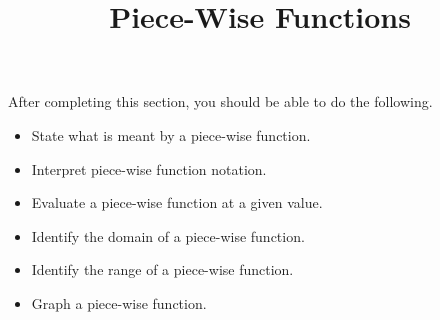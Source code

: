 \documentclass{ximera}
\title{Piece-Wise Functions}
\begin{document}
\begin{abstract} 
\end{abstract}

\maketitle

\begin{sectionOutcomes}
After completing this section, you should be able to do the following.

\begin{itemize}
	\item State what is meant by a piece-wise function.
    \item Interpret piece-wise function notation.
    \item Evaluate a piece-wise function at a given value.
    \item Identify the domain of a piece-wise function.
    \item Identify the range of a piece-wise function.
    \item Graph a piece-wise function.

\end{itemize}
\end{sectionOutcomes}
\end{document}
